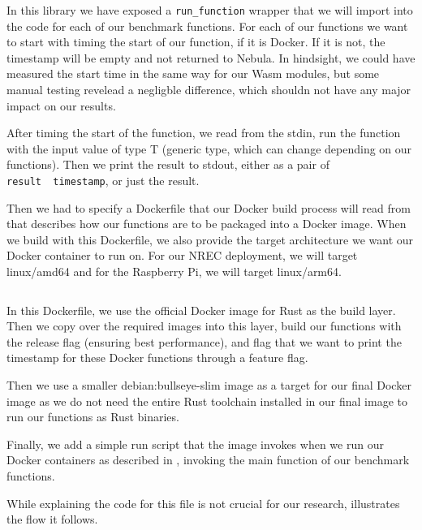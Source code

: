 \documentclass[
  table]{report}
\begin{document}
\inputminted{rust}{assets/code/shared_lib.rs}

In this library we have exposed a \texttt{run\_function} wrapper that we
will import into the code for each of our benchmark functions. For each
of our functions we want to start with timing the start of our function,
if it is Docker. If it is not, the timestamp will be empty and not
returned to Nebula. In hindsight, we could have measured the start time
in the same way for our \ac{Wasm} modules, but some manual testing
revelead a negligble difference, which shouldn not have any major impact
on our results.

After timing the start of the function, we read from the stdin, run the
function with the input value of type T (generic type, which can change
depending on our functions). Then we print the result to stdout, either
as a pair of \texttt{result\ \textbar{}\ timestamp}, or just the result.

Then we had to specify a Dockerfile that our Docker build process will
read from that describes how our functions are to be packaged into a
Docker image. When we build with this Dockerfile, we also provide the
target architecture we want our Docker container to run on. For our
\ac{NREC} deployment, we will target linux/amd64 and for the Raspberry
Pi, we will target linux/arm64.

\inputminted{toml}{assets/code/Dockerfile}

In this Dockerfile, we use the official Docker image for Rust as the
build layer. Then we copy over the required images into this layer,
build our functions with the release flag (ensuring best performance),
and flag that we want to print the timestamp for these Docker functions
through a feature flag.

Then we use a smaller debian:bullseye-slim image as a target for our
final Docker image as we do not need the entire Rust toolchain installed
in our final image to run our functions as Rust binaries.

Finally, we add a simple run script that the image invokes when we run
our Docker containers as described in ,
invoking the main function of our benchmark functions.

While explaining the code for this file is not crucial for our research,
 illustrates the flow it follows.
\end{document}
